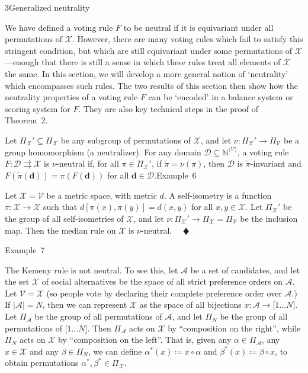 \documentclass[
]{article}
\begin{document}
\protect{}\label{s000015}
3Generalized neutrality

We have defined a voting rule \(F\) to be neutral if it is equivariant
under all permutations of \(\mathcal{X}\). However, there are many
voting rules which fail to satisfy this stringent condition, but which
are still equivariant under some permutations of
\(\mathcal{X}\)---enough that there is still a sense in which these
rules treat all elements of \(\mathcal{X}\) the same. In this section,
we will develop a more general notion of `neutrality' which encompasses
such rules. The two results of this section then show how the neutrality
properties of a voting rule \(F\) can be `encoded' in a balance system
or scoring system for \(F\). They are also key technical steps in the
proof of Theorem~2.

Let \(\Pi_{\mathcal{X}}' \subseteq \Pi_{\mathcal{X}}\) be any subgroup
of permutations of \(\mathcal{X}\), and let
\(\left. \nu:\Pi_{\mathcal{X}}'\longrightarrow\Pi_{\mathcal{V}} \right.\)
be a group homomorphism (a neutralizer). For any domain
\(\mathcal{D} \subseteq \mathbb{N}^{\langle\mathcal{V}\rangle}\), a
voting rule \(\left. F:\mathcal{D}\rightrightarrows\mathcal{X} \right.\)
is \(\mathsf{\nu}\)-neutral if, for all \(\pi \in \Pi_{\mathcal{X}}'\),
if \(\widetilde{\pi} = \nu(\pi)\), then \(\mathcal{D}\) is
\(\widetilde{\pi}\)-invariant and
\(F\left( \widetilde{\pi}\left( \mathbf{d} \right) \right) = \pi\left( F\left( \mathbf{d} \right) \right)\)
for all \(\mathbf{d} \in \mathcal{D}\).Example~6

Let \(\mathcal{X} = \mathcal{V}\) be a metric space, with metric \(d\).
A self-isometry is a function
\(\left. \pi:\mathcal{X}\longrightarrow\mathcal{X} \right.\) such that
\(d\left\lbrack \pi(x),\pi(y) \right\rbrack = d(x,y)\) for all
\(x,y \in \mathcal{X}\). Let \(\Pi_{\mathcal{X}}'\) be the group of all
self-isometries of \(\mathcal{X}\), and let
\(\left. \nu:\Pi_{\mathcal{X}}'\longrightarrow\Pi_{\mathcal{X}} = \Pi_{\mathcal{V}} \right.\)
be the inclusion map. Then the median rule on \(\mathcal{X}\) is
\(\nu\)-neutral. \(\quad ♦\)

Example~7

The Kemeny rule is not neutral. To see this, let \(\mathcal{A}\) be a
set of candidates, and let the set \(\mathcal{X}\) of social
alternatives be the space of all strict preference orders on
\(\mathcal{A}\). Let \(\mathcal{V} = \mathcal{X}\) (so people vote by
declaring their complete preference order over \(\mathcal{A}\).) If
\(\left| \mathcal{A} \right| = N\), then we can represent
\(\mathcal{X}\) as the space of all bijections
\(\left. x:\mathcal{A}\longrightarrow\lbrack 1\ldots N\rbrack \right.\).
Let \(\Pi_{\mathcal{A}}\) be the group of all permutations of
\(\mathcal{A}\), and let \(\Pi_{N}\) be the group of all permutations of
\(\lbrack 1\ldots N\rbrack\). Then \(\Pi_{\mathcal{A}}\) acts on
\(\mathcal{X}\) by ``composition on the right'', while \(\Pi_{N}\) acts
on \(\mathcal{X}\) by ``composition on the left''. That is, given any
\(\alpha \in \Pi_{\mathcal{A}}\), any \(x \in \mathcal{X}\) and any
\(\beta \in \Pi_{N}\), we can define
\(\alpha^{\ast}(x) ≔ x \circ \alpha\) and
\(\beta^{\ast}(x) ≔ \beta \circ x\), to obtain permutations
\(\alpha^{\ast},\beta^{\ast} \in \Pi_{\mathcal{X}}\).
\end{document}
